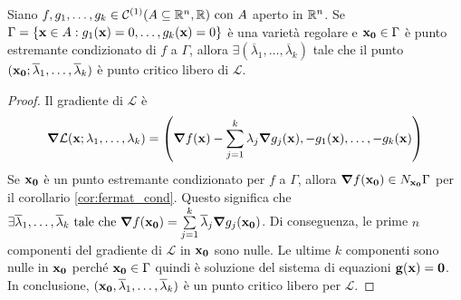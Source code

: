\begin{theorem}
    Siano $f,g_1,\dots,g_k \in \mathcal{C}^{(1)}(A\subseteq\mathbb{R}^n, \mathbb{R}) \text{ con } A$ aperto in $\mathbb{R}^n$. Se $\Gamma = \{ \vb{x} \in A: g_1 (\vb{x})=0, \dots, g_k(\vb{x})=0 \}$ è una varietà regolare e $\vb{x_0} \in \Gamma$ è punto estremante condizionato di $f$ a $\Gamma$, allora $\exists (\overline{\lambda}_1, \dots,\overline{\lambda}_k)$ tale che il punto $(\vb{x_0}; \overline{\lambda}_1,\dots,\overline{\lambda}_k)$ è punto critico libero di $\mathcal{L}$.
\end{theorem}

\begin{proof}
    Il gradiente di $\mathcal{L}$ è
    $$
        \grad \mathcal{L}(\vb{x};\lambda_1,\dots,\lambda_k)=\left(\grad f(\vb{x})-\sum_{j=1}^{k}\lambda_j\grad g_j(\vb{x}),-g_1(\vb{x}),\dots,-g_k(\vb{x})\right)
    $$
    Se $\vb{x_0}$ è un punto estremante condizionato per $f$ a $\Gamma$, allora $\grad f(\vb{x_0})\in N_{\vb{x_0}}\Gamma$ per il corollario \ref{cor:fermat_cond}. Questo significa che $\exists \overline{\lambda}_1,\dots,\overline{\lambda}_k \text{ tale che } \grad f(\vb{x_0}) = \sum\limits_{j=1}^k\overline{\lambda}_j\grad g_j(\vb{x_0})$. Di conseguenza, le prime $n$ componenti del gradiente di $\mathcal{L}$ in $\vb{x_0}$ sono nulle. Le ultime $k$ componenti sono nulle in $\vb{x_0}$ perché $\vb{x_0}\in\Gamma$ quindi è soluzione del sistema di equazioni $\vb{g}(\vb{x})=\vb{0}$.
    In conclusione, $(\vb{x_0},\overline{\lambda}_1,\dots,\overline{\lambda}_k)$ è un punto critico libero per $\mathcal{L}$.
\end{proof}

